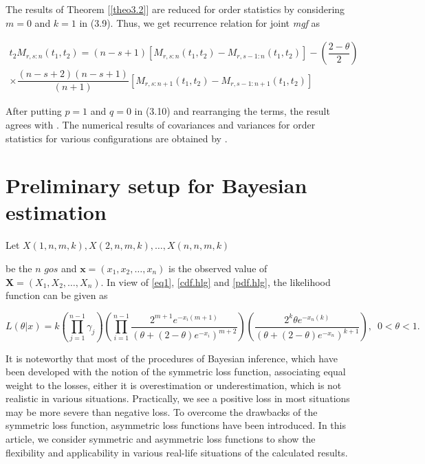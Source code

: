 \documentclass[11pt,a4paper]{article}
\numberwithin{equation}{section}
\begin{document}
\noindent The results of Theorem [\ref{theo3.2}] are reduced for order statistics by considering $m=0$ and $k=1$ in (3.9). Thus, we get recurrence relation for joint \textit{mgf} as

			\begin{eqnarray}

			t_{2}M_{r,s:n}(t_{1},t_{2})={(n-s+1)}\left[M_{r,s:n}(t_{1},t_{2})-M_{r,s-1:n}(t_{1},t_{2})\right]-\left(\dfrac{2-\theta}{2}\right)\nonumber\\

			\times\dfrac{\left(n-s+2\right)\left(n-s+1\right)}{(n+1)}\left[M_{r,s:n+1}(t_{1},t_{2})-M_{r,s-1:n+1}(t_{1},t_{2})\right]

		\end{eqnarray}

\noindent After putting $p=1$ and $q=0$ in (3.10) and rearranging the terms, the result agrees with \cite{liu2020recurrence}. The numerical results of covariances and variances for order statistics for various configurations are obtained by \cite{liu2020recurrence}.

\section{Preliminary setup for Bayesian estimation}\label{sec:bayes}

	Let $X(1,n,m,k),X(2,n,m,k),\ldots,X(n,n,m,k)$

	be the $n$ $gos$ and $\boldsymbol{x}=(x_1,x_2,\ldots,x_n)$ is the observed value of $\boldsymbol{X}=(X_1,X_2,\ldots,X_n)$. In view of \eqref{eq1}, \eqref{cdf.hlg} and \eqref{pdf.hlg}, the likelihood function can be given as

	\begin{equation}\label{lik.eq}

		L\left(\theta|x\right)=k\left(\prod_{j=1}^{n-1}\gamma_{j}\right)\left(\prod_{i=1}^{n-1}\dfrac{2^{m+1}e^{-x_{i}(m+1)}}{\left(\theta+(2-\theta)e^{-x_{i}}\right)^{m+2}}\right)\left(\dfrac{2^{k}\theta e^{-x_{n}(k)}}{\left(\theta+(2-\theta)e^{-x_{n}}\right)^{k+1}}\right),\,\,\,  0<\theta<1.

	\end{equation}

	It is noteworthy that most of the procedures of Bayesian inference, which have been developed with the notion of the symmetric loss function, associating equal weight to the losses, either it is overestimation or underestimation, which is not realistic in various situations. Practically, we see a positive loss in most situations may be more severe than negative loss. To overcome the drawbacks of the symmetric loss function, asymmetric loss functions have been introduced. In this article, we consider symmetric and asymmetric loss functions to show the flexibility and applicability in various real-life situations of the calculated results. \\
\end{document}
